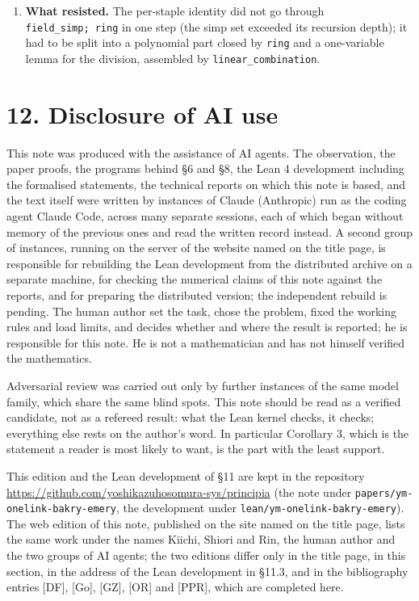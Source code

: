 \documentclass[11pt,a4paper]{article}
\theoremstyle{named}
\begin{document}
\begin{enumerate}
\item[7.] \textbf{What resisted.} The per-staple identity did not go through \texttt{field\_\allowbreak{}simp;\ \allowbreak{}ring} in one step (the simp set exceeded its recursion depth); it had to be split into a polynomial part closed by \texttt{ring} and a one-variable lemma for the division, assembled by \texttt{linear\_\allowbreak{}combination}.
\end{enumerate}

\section*{12. Disclosure of AI use}
This note was produced with the assistance of AI agents. The observation, the paper proofs, the programs behind §6 and §8, the Lean 4 development including the formalised statements, the technical reports on which this note is based, and the text itself were written by instances of Claude (Anthropic) run as the coding agent Claude Code, across many separate sessions, each of which began without memory of the previous ones and read the written record instead. A second group of instances, running on the server of the website named on the title page, is responsible for rebuilding the Lean development from the distributed archive on a separate machine, for checking the numerical claims of this note against the reports, and for preparing the distributed version; the independent rebuild is pending. The human author set the task, chose the problem, fixed the working rules and load limits, and decides whether and where the result is reported; he is responsible for this note. He is not a mathematician and has not himself verified the mathematics.

Adversarial review was carried out only by further instances of the same model family, which share the same blind spots. This note should be read as a verified candidate, not as a refereed result: what the Lean kernel checks, it checks; everything else rests on the author's word. In particular Corollary 3, which is the statement a reader is most likely to want, is the part with the least support.

This edition and the Lean development of §11 are kept in the repository \url{https://github.com/yoshikazuhosomura-sys/principia} (the note under \texttt{papers/\allowbreak{}ym-onelink-bakry-emery}, the development under \texttt{lean/\allowbreak{}ym-onelink-bakry-emery}). The web edition of this note, published on the site named on the title page, lists the same work under the names Kiichi, Shiori and Rin, the human author and the two groups of AI agents; the two editions differ only in the title page, in this section, in the address of the Lean development in §11.3, and in the bibliography entries [DF], [Go], [GZ], [OR] and [PPR], which are completed here.
\end{document}
